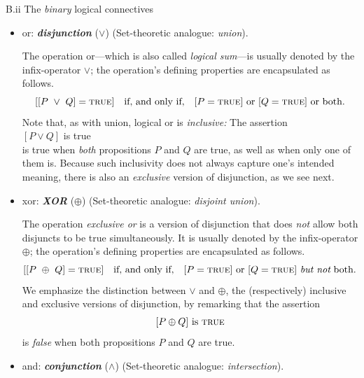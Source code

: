 \medskip

\noindent B.ii {\small\sf The {\em binary} logical connectives}
\begin{itemize}
\item
{\sc or}: {\bf\em disjunction} ($\vee$)
\hspace*{.1in}
{\small\sf (Set-theoretic analogue: {\em union})}.

\smallskip

The operation {\sc or}---which is also called {\em logical sum}---is usually denoted by the infix-operator $\vee$; the operation's defining properties are encapsulated as follows.
\[
[[P \ \vee \ Q] =  \mbox{\sc true}] \ \ \mbox{ if, and only if, } \ \ 
[P = \mbox{\sc true}] \mbox{ or }
[Q = \mbox{\sc true}] \mbox{ or both}.
\]
Note that, as with union, logical {\sc or} is {\em inclusive:}  The assertion \\
\hspace*{.35in}$[P \vee Q]$ is \mbox{\sc true} \\
%
is true when {\em both} propositions $P$ and $Q$ are true, as well as when only one of them is.  Because such inclusivity does not always capture one's intended meaning, there is also an {\em exclusive} version of disjunction, as we see next.

\medskip\item 
{\sc xor}: {\bf\em XOR} ($\oplus$)
\hspace*{.1in}
{\small\sf (Set-theoretic analogue: {\em disjoint union})}.

\smallskip

The operation {\em exclusive or} is a version of disjunction that does {\em not} allow both disjuncts to be true simultaneously.  It is usually denoted by the infix-operator $\oplus$; the operation's defining properties are encapsulated as follows.
\[
[[P \ \oplus \ Q] =  \mbox{\sc true}] \ \ \mbox{ if, and only if, } \ \ 
[P = \mbox{\sc true}] \mbox{ or }
[Q = \mbox{\sc true}] \mbox{ {\em but not} both}.
\]
We emphasize the distinction between $\vee$ and $\oplus$, the (respectively) inclusive and exclusive versions of disjunction, by remarking that the assertion
\[
[P \oplus Q]  \mbox{ is } \mbox{\sc true}
\]
is {\em false} when both propositions $P$ and $Q$ are true.

\medskip\item
{\sc and}:  {\bf\em conjunction} ($\wedge$)
\hspace*{.1in}
{\small\sf (Set-theoretic analogue: {\em intersection})}.
\index{logical operation!conjunction ($\wedge$)}


\end{itemize}
